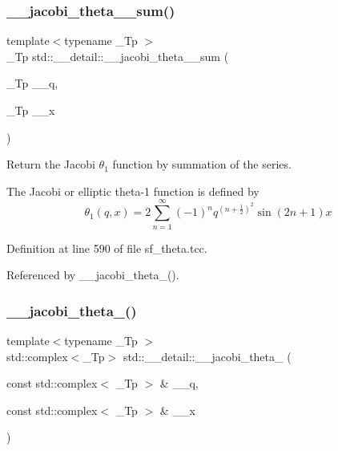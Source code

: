 \subsubsection{\texorpdfstring{\+\_\+\+\_\+jacobi\+\_\+theta\+\_\+\_\+sum()}{\_\_jacobi\_theta\_1\_sum()}}
{\footnotesize\ttfamily template$<$typename \+\_\+\+Tp $>$ \\
\+\_\+\+Tp std\+::\+\_\+\+\_\+detail\+::\+\_\+\+\_\+jacobi\+\_\+theta\+\_\+\_\+sum (\begin{DoxyParamCaption}\item[{\+\_\+\+Tp}]{\+\_\+\+\_\+q,  }\item[{\+\_\+\+Tp}]{\+\_\+\+\_\+x }\end{DoxyParamCaption})}

Return the Jacobi $ \theta_1 $ function by summation of the series.

The Jacobi or elliptic theta-\/1 function is defined by \[ \theta_1(q,x) = 2\sum_{n=1}^{\infty}(-1)^n q^{(n+\frac{1}{2})^2}\sin{(2n+1)x} \] 

Definition at line 590 of file sf\+\_\+theta.\+tcc.



Referenced by \+\_\+\+\_\+jacobi\+\_\+theta\+\_().

\mbox{\label{namespacestd_1_1____detail_a78ac45872aa909886eebeef2ff29bf3d}} 
\subsubsection{\texorpdfstring{\+\_\+\+\_\+jacobi\+\_\+theta\+\_()}{\_\_jacobi\_theta\_2()}\hspace{0.1cm}{\footnotesize\ttfamily [1/2]}}
{\footnotesize\ttfamily template$<$typename \+\_\+\+Tp $>$ \\
std\+::complex$<$\+\_\+\+Tp$>$ std\+::\+\_\+\+\_\+detail\+::\+\_\+\+\_\+jacobi\+\_\+theta\+\_ (\begin{DoxyParamCaption}\item[{const std\+::complex$<$ \+\_\+\+Tp $>$ \&}]{\+\_\+\+\_\+q,  }\item[{const std\+::complex$<$ \+\_\+\+Tp $>$ \&}]{\+\_\+\+\_\+x }\end{DoxyParamCaption})}

